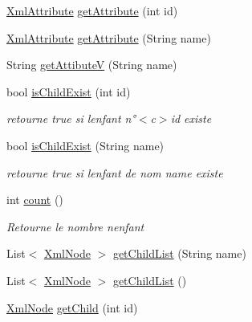 \begin{DoxyCompactItemize}
\item 
\mbox{\hyperlink{class_n_t_k_1_1_i_o_1_1_xml_1_1_xml_attribute}{Xml\+Attribute}} \mbox{\hyperlink{class_n_t_k_1_1_i_o_1_1_xml_1_1_xml_node_a3b8c5adaae1bd784ef89e1f57cb3e34c}{get\+Attribute}} (int id)
\item 
\mbox{\hyperlink{class_n_t_k_1_1_i_o_1_1_xml_1_1_xml_attribute}{Xml\+Attribute}} \mbox{\hyperlink{class_n_t_k_1_1_i_o_1_1_xml_1_1_xml_node_a13815fd610930b6821028dbce7a19104}{get\+Attribute}} (String name)
\item 
String \mbox{\hyperlink{class_n_t_k_1_1_i_o_1_1_xml_1_1_xml_node_a1f6585774be829cad7e6416b8e9a177b}{get\+AttibuteV}} (String name)
\item 
bool \mbox{\hyperlink{class_n_t_k_1_1_i_o_1_1_xml_1_1_xml_node_a8333f5c9c08d160ba0d4846ed38b5505}{is\+Child\+Exist}} (int id)
\begin{DoxyCompactList}\small\item\em retourne true si l\textquotesingle{}enfant n°$<$c$>$id existe \end{DoxyCompactList}\item 
bool \mbox{\hyperlink{class_n_t_k_1_1_i_o_1_1_xml_1_1_xml_node_a7eea3296cab5aeac120858fe9c29e0cb}{is\+Child\+Exist}} (String name)
\begin{DoxyCompactList}\small\item\em retourne true si l\textquotesingle{}enfant de nom name existe \end{DoxyCompactList}\item 
int \mbox{\hyperlink{class_n_t_k_1_1_i_o_1_1_xml_1_1_xml_node_abbdcf78ce42cca075453c38842d1db54}{count}} ()
\begin{DoxyCompactList}\small\item\em Retourne le nombre n\textquotesingle{}enfant \end{DoxyCompactList}\item 
List$<$ \mbox{\hyperlink{class_n_t_k_1_1_i_o_1_1_xml_1_1_xml_node}{Xml\+Node}} $>$ \mbox{\hyperlink{class_n_t_k_1_1_i_o_1_1_xml_1_1_xml_node_a75af2d3186bd3ed01bec45ded6413923}{get\+Child\+List}} (String name)
\item 
List$<$ \mbox{\hyperlink{class_n_t_k_1_1_i_o_1_1_xml_1_1_xml_node}{Xml\+Node}} $>$ \mbox{\hyperlink{class_n_t_k_1_1_i_o_1_1_xml_1_1_xml_node_affb0d7cd6b58825a00fd124a14537f73}{get\+Child\+List}} ()
\item 
\mbox{\hyperlink{class_n_t_k_1_1_i_o_1_1_xml_1_1_xml_node}{Xml\+Node}} \mbox{\hyperlink{class_n_t_k_1_1_i_o_1_1_xml_1_1_xml_node_afdf43970beeaf6d1d5a628e93f69c0c0}{get\+Child}} (int id)

\end{DoxyCompactItemize}
